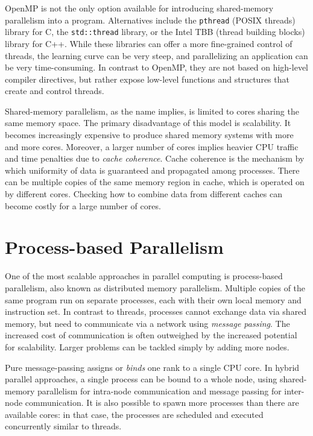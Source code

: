 OpenMP is not the only option available for introducing shared-memory parallelism into a program. Alternatives include the \texttt{pthread} (POSIX threads) library for C, the \texttt{std::thread} library, or the Intel TBB (thread building blocks) library for C++. While these libraries can offer a more fine-grained control of threads, the learning curve can be very steep, and parallelizing an application can be very time-consuming. In contrast to OpenMP, they are not based on high-level compiler directives, but rather expose low-level functions and structures that create and control threads. 

Shared-memory parallelism, as the name implies, is limited to cores sharing the same memory space. The primary disadvantage of this model is scalability. It becomes increasingly expensive to produce shared memory systems with more and more cores. Moreover, a larger number of cores implies heavier CPU traffic and time penalties due to \emph{cache coherence}. Cache coherence is the mechanism by which uniformity of data is guaranteed and propagated among processes. There can be multiple copies of the same memory region in cache, which is operated on by different cores. Checking how to combine data from different caches can become costly for a large number of cores.

\section{Process-based Parallelism}

One of the most scalable approaches in parallel computing is process-based parallelism, also known as distributed memory parallelism. Multiple copies of the same program run on separate processes, each with their own local memory and instruction set. In contrast to threads, processes cannot exchange data via shared memory, but need to communicate via a network using \emph{message passing}. The increased cost of communication is often outweighed by the increased potential for scalability. Larger problems can be tackled simply by adding more nodes. 

Pure message-passing assigns or \emph{binds} one rank to a single CPU core. In hybrid parallel approaches, a single process can be bound to a whole node, using shared-memory parallelism for intra-node communication and message passing for inter-node communication. It is also possible to spawn more processes than there are available cores: in that case, the processes are scheduled and executed concurrently similar to threads.

